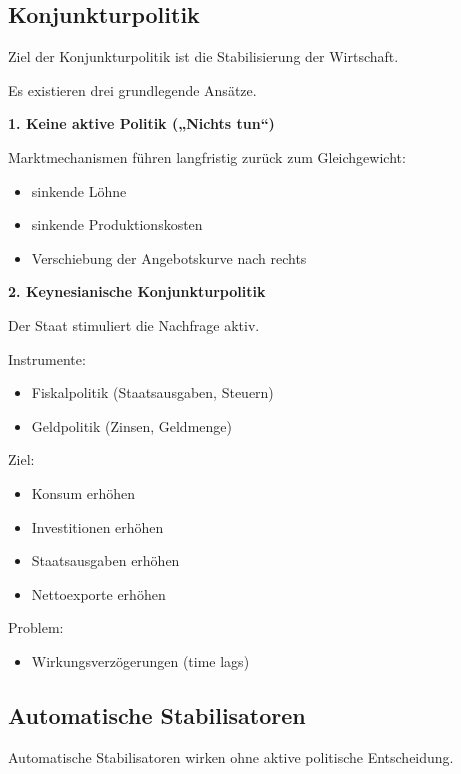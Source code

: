 \subsection{Konjunkturpolitik}

Ziel der Konjunkturpolitik ist die Stabilisierung der Wirtschaft.

Es existieren drei grundlegende Ansätze.

\textbf{1. Keine aktive Politik („Nichts tun“)}

Marktmechanismen führen langfristig zurück zum Gleichgewicht:

\begin{itemize}
\item sinkende Löhne
\item sinkende Produktionskosten
\item Verschiebung der Angebotskurve nach rechts
\end{itemize}

\textbf{2. Keynesianische Konjunkturpolitik}

Der Staat stimuliert die Nachfrage aktiv.

Instrumente:

\begin{itemize}
\item Fiskalpolitik (Staatsausgaben, Steuern)
\item Geldpolitik (Zinsen, Geldmenge)
\end{itemize}

Ziel:

\begin{itemize}
\item Konsum erhöhen
\item Investitionen erhöhen
\item Staatsausgaben erhöhen
\item Nettoexporte erhöhen
\end{itemize}

Problem:

\begin{itemize}
\item Wirkungsverzögerungen (time lags)
\end{itemize}


\subsection{Automatische Stabilisatoren}

Automatische Stabilisatoren wirken ohne aktive politische Entscheidung.

